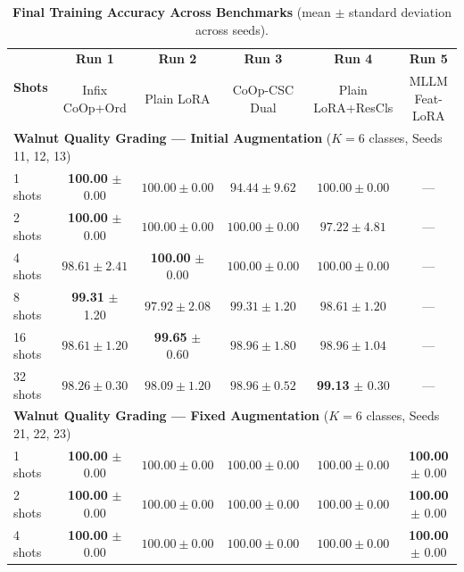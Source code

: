 \documentclass[letterpaper,11pt,leqno]{article}
\begin{document}
\begin{table}[H]
\centering
\small
\renewcommand{\arraystretch}{0.85}
\setlength{\tabcolsep}{4pt}
\caption{\textbf{Final Training Accuracy Across Benchmarks} (mean $\pm$ standard deviation across seeds).}
\label{tab:train_results}
\begin{tabular*}{\textwidth}{@{\extracolsep{\fill}}lccccc}
\toprule
\multirow{2}{*}{\textbf{Shots}} & \textbf{Run 1} & \textbf{Run 2} & \textbf{Run 3} & \textbf{Run 4} & \textbf{Run 5} \\
 & \scriptsize Infix CoOp+Ord & \scriptsize Plain LoRA & \scriptsize CoOp-CSC Dual & \scriptsize Plain LoRA+ResCls & \scriptsize MLLM Feat-LoRA \\
\midrule
\multicolumn{6}{l}{\textbf{Walnut Quality Grading --- Initial Augmentation} ($K=6$ classes, Seeds 11, 12, 13)} \\
\midrule
 1 shots & \cellcolor{bestgreen}\textbf{100.00} $\pm$ 0.00 & $100.00 \pm 0.00$ & $94.44 \pm 9.62$ & $100.00 \pm 0.00$ & --- \\
 2 shots & \cellcolor{bestgreen}\textbf{100.00} $\pm$ 0.00 & $100.00 \pm 0.00$ & $100.00 \pm 0.00$ & $97.22 \pm 4.81$ & --- \\
 4 shots & $98.61 \pm 2.41$ & \cellcolor{bestgreen}\textbf{100.00} $\pm$ 0.00 & $100.00 \pm 0.00$ & $100.00 \pm 0.00$ & --- \\
 8 shots & \cellcolor{bestgreen}\textbf{99.31} $\pm$ 1.20 & $97.92 \pm 2.08$ & $99.31 \pm 1.20$ & $98.61 \pm 1.20$ & --- \\
 16 shots & $98.61 \pm 1.20$ & \cellcolor{bestgreen}\textbf{99.65} $\pm$ 0.60 & $98.96 \pm 1.80$ & $98.96 \pm 1.04$ & --- \\
 32 shots & $98.26 \pm 0.30$ & $98.09 \pm 1.20$ & $98.96 \pm 0.52$ & \cellcolor{bestgreen}\textbf{99.13} $\pm$ 0.30 & --- \\
\midrule
\multicolumn{6}{l}{\textbf{Walnut Quality Grading --- Fixed Augmentation} ($K=6$ classes, Seeds 21, 22, 23)} \\
\midrule
 1 shots & \cellcolor{bestgreen}\textbf{100.00} $\pm$ 0.00 & $100.00 \pm 0.00$ & $100.00 \pm 0.00$ & $100.00 \pm 0.00$ & \cellcolor{bestgreen}\textbf{100.00} $\pm$ 0.00 \\
 2 shots & \cellcolor{bestgreen}\textbf{100.00} $\pm$ 0.00 & $100.00 \pm 0.00$ & $100.00 \pm 0.00$ & $100.00 \pm 0.00$ & \cellcolor{bestgreen}\textbf{100.00} $\pm$ 0.00 \\
 4 shots & \cellcolor{bestgreen}\textbf{100.00} $\pm$ 0.00 & $100.00 \pm 0.00$ & $100.00 \pm 0.00$ & $100.00 \pm 0.00$ & \cellcolor{bestgreen}\textbf{100.00} $\pm$ 0.00 \\

\end{tabular*}
\end{table}
\end{document}
